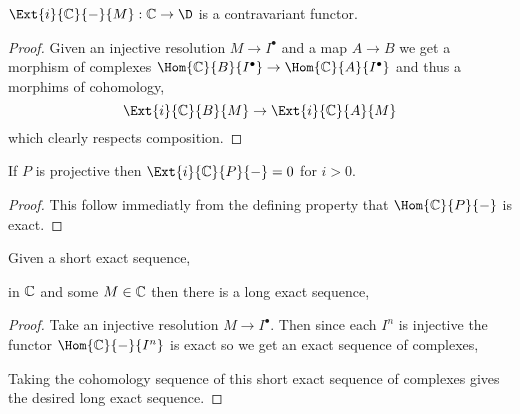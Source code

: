 \documentclass[12pt]{article}
\begin{document}
\begin{lemma}
$\Ext{i}{\C}{-}{M} : \C \to \D$ is a contravariant functor. 
\end{lemma}

\begin{proof}
Given an injective resolution $M \to I^\bullet$ and a map $A \to B$ we get a morphism of complexes $\Hom{\C}{B}{I^\bullet} \to \Hom{\C}{A}{I^\bullet}$ and thus a morphims of cohomology,
\[ \Ext{i}{\C}{B}{M} \to \Ext{i}{\C}{A}{M} \]
which clearly respects composition.
\end{proof}

\begin{lemma}
If $P$ is projective then $\Ext{i}{\C}{P}{-} = 0$ for $i > 0$.
\end{lemma}

\begin{proof}
This follow immediatly from the defining property that $\Hom{\C}{P}{-}$ is exact.
\end{proof}

\begin{prop}
Given a short exact sequence,
\begin{center}
\end{center}
in $\mathbb{C}$ and some $M \in \mathbb{C}$ then there is a long exact sequence, 
\begin{center}
\end{center}
\end{prop}

\begin{proof}
Take an injective resolution $M \to I^\bullet$. Then since each $I^n$ is injective the functor $\Hom{\C}{-}{I^n}$ is exact so we get an exact sequence of complexes,
\begin{center}
\end{center}
Taking the cohomology sequence of this short exact sequence of complexes gives the desired long exact sequence. 
\end{proof}
\end{document}
